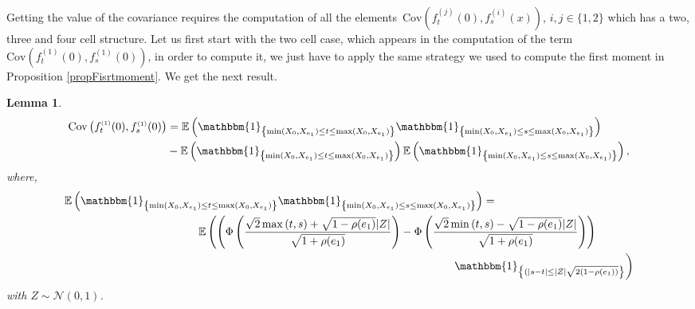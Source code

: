 \documentclass[12pt]{article}
\theoremstyle{Theorem}
\newtheorem{Lemma}[Theorem]{Lemma}
\begin{document}
Getting the value of the covariance requires the computation of all the \linebreak elements~$\text{Cov}\left(f_{t}^{\scriptscriptstyle (j)}(0), f_{s}^{\scriptscriptstyle (i)}(x)\right)$, $i,j \in\{1,2\}$ which has a two, three and four cell structure. Let us first start with the two cell case, which appears in the computation of the term $\text{Cov}\left(f_{t}^{\scriptscriptstyle (1)}(0), f_{s}^{\scriptscriptstyle (1)}(0)\right)$, in order to compute it, we just have to apply the same strategy we used to compute the first moment in Proposition \ref{propFisrtmoment}. We get the next result.
\begin{Lemma}
\begin{align*}
\text{Cov}\left(f_{t}^{\scriptscriptstyle (1)}(0), f_{s}^{\scriptscriptstyle (1)}(0)\right) & = \mathbb{E}\left(\mathbbm{1}_{\left\{\min(X_{\scriptscriptstyle 0}, X_{\scriptscriptstyle  e_1}) \leq t \leq \max(X_{\scriptscriptstyle 0}, X_{e_1})\right\}}\mathbbm{1}_{\left\{\min(X_{\scriptscriptstyle 0}, X_{ \scriptscriptstyle  e_1}) \leq s \leq \max(X_{\scriptscriptstyle 0}, X_{\scriptscriptstyle e_1}) \right\}}\right) \\
& - \mathbb{E}\left(\mathbbm{1}_{\left\{\min(X_{\scriptscriptstyle 0}, X_{e_1}) \leq t \leq \max(X_{\scriptscriptstyle 0}, X_{e_1})\right\}}\right)\mathbb{E}\left(\mathbbm{1}_{\left\{\min(X_{\scriptscriptstyle 0}, X_{e_1}) \leq s \leq \max(X_{\scriptscriptstyle 0}, X_{e_1})\right\}}\right),
\end{align*}
where, 
{\small
\begin{align*}
\mathbb{E}\left(\mathbbm{1}_{\left\{\min(X_{\scriptscriptstyle 0}, X_{\scriptscriptstyle  e_1}) \leq t \leq \max(X_{\scriptscriptstyle 0}, X_{e_1})\right\}}\mathbbm{1}_{\left\{\min(X_{\scriptscriptstyle 0}, X_{ \scriptscriptstyle  e_1}) \leq s \leq \max(X_{\scriptscriptstyle 0}, X_{\scriptscriptstyle e_1}) \right\}}\right) & = \\
& \hspace{-9cm}\mathbb{E}\left(\left(\Phi\left(\dfrac{\sqrt{2}\max\left(t,s\right) + \sqrt{1-\rho(e_1)}|Z|}{\sqrt{1+\rho(e_1)}}\right)  - \Phi\left(\dfrac{\sqrt{2}\min\left(t,s\right) - \sqrt{1-\rho(e_1)}|Z|}{\sqrt{1+\rho(e_1)}}\right)\right)\right. \\
& \hspace{-1cm} \left.\mathbbm{1}_{\left\{(|s-t| \leq |Z|\sqrt{2(1-\rho(e_1))}\right\}}\right)
\end{align*}}
with $Z \sim \mathcal{N}(0,1)$. 
\end{Lemma}
\end{document}
